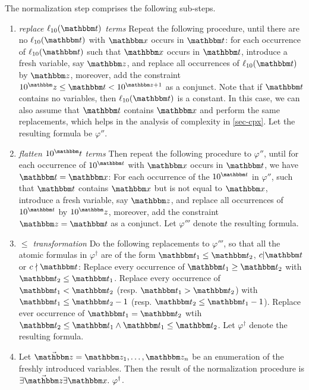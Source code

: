 The normalization step comprises the following sub-steps.
\begin{enumerate}


\item \textit{replace $\ell_{10}(\iterm)$ terms} Repeat the following procedure, until there are no $\ell_{10}(\iterm)$ with $\ivarx$ occurs in $\iterm$: for each occurrence of $\ell_{10}(\iterm)$ such that $\ivarx$ occurs in $\iterm$, introduce a fresh variable, say $\ivarz$, and replace all occurrences of $\ell_{10}(\iterm)$ by $\ivarz$, moreover, add the constraint $10^\ivarz \le \iterm < 10^{\ivarz + 1}$ as a conjunct. Note that if $\iterm$ contains no variables, then $\ell_{10}(\iterm)$ is a constant. In this case, we can also assume that $\iterm$ contains $\ivarx$ and perform the same replacements, which helps in the analysis of complexity in \ref{sec-cpx}. Let the resulting formula be $\varphi''$.
%

\item \textit{flatten $10^\iterm$ terms} Then repeat the following procedure to $\varphi''$, until for each occurrence of $10^{\iterm}$ with $\ivarx$ occurs in $\iterm$, we have $\iterm = \ivarx$: For each occurrence of the $10^{\iterm}$ in $\varphi''$, such that $\iterm$ contains $\ivarx$ but is not equal to $\ivarx$, introduce a fresh variable, say $\ivarz$, and replace all occurrences of $10^{\iterm}$ by $10^\ivarz$, moreover, add the constraint $\ivarz = \iterm$ as a conjunct. Let $\varphi'''$ denote the resulting formula.  

\item \textit{$\le$ transformation} Do the following replacements to $\varphi'''$, so that all the atomic formulas in $\varphi^\dag$ are of the form $\iterm_1 \le \iterm_2$, $c \vert  \iterm$ or $c \nmid \iterm$: Replace every occurrence of $\iterm_1 \ge \iterm_2$ with $\iterm_2 \le \iterm_1$. Replace every occurrence of $\iterm_1 < \iterm_2$ (resp. $\iterm_1 > \iterm_2$) with $\iterm_1 \le \iterm_2 - 1$ (resp. $\iterm_2 \le \iterm_1-1$). Replace ever occurrence of $\iterm_1 = \iterm_2$ wtih $\iterm_2 \le \iterm_1 \wedge \iterm_1 \le \iterm_2$. Let $\varphi^\dag$ denote the resulting formula. 

\item Let $\vec{\ivarz} = \ivarz_1,\ldots, \ivarz_n$ be an enumeration of the freshly introduced variables. Then the result of the normalization procedure is 
$\exists \vec{\ivarz}\exists \ivarx.\ \varphi^\dag$.
\end{enumerate}

